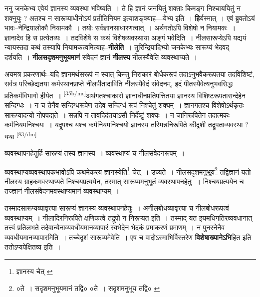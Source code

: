 \documentclass[article,12pt,a4paper]{memoir}
\begin{document}
	  \pstart ननु जनकेभ्य एवेयं ज्ञानस्य व्यवस्था भविष्यति । ते हि ज्ञानं जनयितुं शक्ताः किमङ्ग निश्चाययितुं न शक्नुयुः ? अतश्च न सारूप्याधीनोऽयं प्रतीतिनियम इत्याशङ्क्याह—येभ्य इति । \textbf{हि}र्यस्मात् । एवं ब्रुवतोऽयं भावः--नेन्द्रियालोकौ नियामकौ । तयोः सर्वज्ञानसाधारणत्वात् । अर्थगतोऽपि विशेषो न नियामकः । ज्ञानादेव हि स प्रत्येतव्यः । तदविशेषे स कथं विशेषव्यवस्थाया अङ्गं भवेदिति । नीलसारूप्येऽपि यद्ययं न्यायस्तदा कथं तस्यापि नियामकत्वमित्याह--\textbf{नीलेति} । तुरिन्द्रियादिभ्यो जनकेभ्यः सारूप्यं भेदवद् दर्शयति । \textbf{नीलसदृशमनुभूयमानं} संवेदनं ज्ञानं \textbf{नीलस्य} नीलस्यैवेति व्यवस्थाप्यते ।
	\pend
      

	  \pstart अयमत्र प्रकरणार्थः--यदि ज्ञानमर्थसरूपं न स्यात् किन्तु निराकारं बोधैकरूपं तदाऽनुभवैकरूपतया तदविशिष्टं, सर्वत्र परिच्छेद्यतया कर्मस्थानप्राप्ते नीलपीतादाविति नीलस्यैवेदं संवेदनम्, इदं पीतस्यैवेत्यनुभवसिद्धः प्रतिकर्मविभागो हीयेत । \leavevmode\textsuperscript{\rmlatinfont\tiny [35b/ms]}अर्थगतश्चाकारो ज्ञानाधीनप्रतिपत्तितया ज्ञानस्य विशिष्टरूपतासन्देहेन सन्दिग्धः । न च तेनैव सन्दिग्धरूपेण तदेव सन्दिग्धं रूपं निश्चेतुं शक्यम् । ज्ञानगतश्च विशेषोऽर्थकृतः सारूप्यादन्यो नोपपद्यते । सन्नपि न तावदिदंतयाऽसौ निर्देष्टुं शक्यः । न चानिरूपितेन तदात्मकः कर्मनियमनिश्चयः । यद्रूपश्च यश्च कर्मनियमनिश्चयो ज्ञानस्य तस्मिन्ननिरूपिते कीदृशी तद्रूपताव्यवस्था ? यथा  \leavevmode\textsuperscript{\rmlatinfont\tiny [83/dm]} 
	  
	व्यवस्थापनहेतुर्हि सारूप्यं तस्य ज्ञानस्य । व्यवस्थाप्यं च नीलसंवेदनरूपम् । 
	  
	व्यवस्थाप्यव्यवस्थापकभावोऽपि कथमेकरय ज्ञानस्येति\footnote{ज्ञानस्य चेत् \cite{dp-msA} \cite{dp-msC} \cite{dp-edP}} चेत् । उच्यते । नीलसदृशमनुभूय\footnote{०ते । सदृशमनुभूयमानं तद्वि० \cite{dp-msA} \cite{dp-msB} \cite{dp-edP} \cite{dp-edH} \cite{dp-edE} \cite{dp-edN} ०ते । सदृशमनुभूय तद्वि० \cite{dp-msC} \cite{dp-msD}} तद्विज्ञानं यतो नीलस्य ग्राहकमवस्थाप्यते निश्चयप्रत्ययेन, तस्मात् सारूप्यमनुभूतं व्यवस्थापनहेतुः । निश्चयप्रत्ययेन च तज्ज्ञानं नीलसंवेदनमवस्थाप्यमानं व्यवस्थाप्यम् । 
	  
	तस्मादसारूप्यव्यावृत्त्या सारूप्यं ज्ञानस्य व्यवस्थापनहेतुः । अनीलबोधव्यावृत्त्या च नीलबोधरूपत्वं व्यवस्थाप्यम् । नीलादिरनिरूपिते क्षणिकत्वे तद्रूपो न निरूप्यत इति । तस्माद् यत इयमधिगतिरव्यवधानात् तत्त्वं प्रतिलभते तदेवान्येनाव्यवधीयमानव्यापारं स्वभेदेन भेदकं प्रमाकरणं प्रमाणम् । न पुनरनेनैव व्यवधीयमानव्यापारमिति । तच्चेदृशं सारूप्यमेवेति । एष च वादोऽस्माभिर्विस्तरेण \textbf{विशेषाख्यानेऽभि}हित इति ततोऽप्यपेक्षितव्य इति ।
	\pend
      
\end{document}
